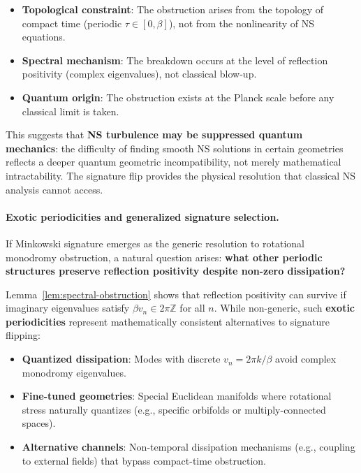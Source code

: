 \documentclass[11pt]{article}
\begin{document}
\begin{itemize}
\item \textbf{Topological constraint}: The obstruction arises from the topology of 
compact time (periodic $\tau \in [0,\beta]$), not from the nonlinearity of NS equations.

\item \textbf{Spectral mechanism}: The breakdown occurs at the level of reflection 
positivity (complex eigenvalues), not classical blow-up.

\item \textbf{Quantum origin}: The obstruction exists at the Planck scale before 
any classical limit is taken.
\end{itemize}

This suggests that \textbf{NS turbulence may be suppressed quantum mechanics}: the 
difficulty of finding smooth NS solutions in certain geometries reflects a deeper 
quantum geometric incompatibility, not merely mathematical intractability. The 
signature flip provides the physical resolution that classical NS analysis cannot access.

\paragraph{Exotic periodicities and generalized signature selection.}
If Minkowski signature emerges as the generic resolution to rotational monodromy 
obstruction, a natural question arises: \textbf{what other periodic structures 
preserve reflection positivity despite non-zero dissipation?}

Lemma~\ref{lem:spectral-obstruction} shows that reflection positivity can survive 
if imaginary eigenvalues satisfy $\beta v_n \in 2\pi\mathbb{Z}$ for all $n$. While 
non-generic, such \textbf{exotic periodicities} represent mathematically consistent 
alternatives to signature flipping:

\begin{itemize}
\item \textbf{Quantized dissipation}: Modes with discrete $v_n = 2\pi k/\beta$ avoid 
complex monodromy eigenvalues.

\item \textbf{Fine-tuned geometries}: Special Euclidean manifolds where rotational 
stress naturally quantizes (e.g., specific orbifolds or multiply-connected spaces).

\item \textbf{Alternative channels}: Non-temporal dissipation mechanisms (e.g., 
coupling to external fields) that bypass compact-time obstruction.
\end{itemize}
\end{document}
